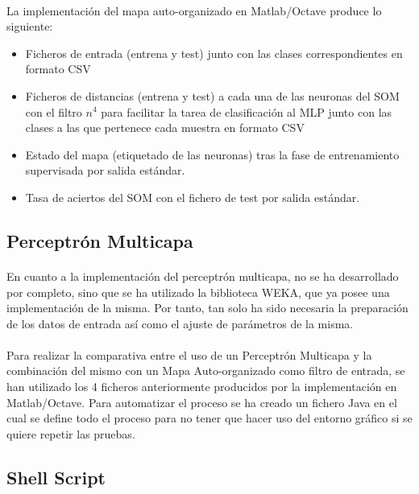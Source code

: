 \documentclass[10pt, a4paper,spanish]{article}
\begin{document}
			\paragraph{}
			La implementación del mapa auto-organizado en Matlab/Octave produce lo siguiente:

			\begin{itemize}
				\item Ficheros de entrada (entrena y test) junto con las clases correspondientes en formato CSV
				\item Ficheros de distancias (entrena y test) a cada una de las neuronas del SOM con el filtro $n^4$ para facilitar la tarea de clasificación al MLP  junto con las clases a las que pertenece cada muestra en formato CSV
				\item Estado del mapa (etiquetado de las neuronas) tras la fase de entrenamiento supervisada por salida estándar.
				\item Tasa de aciertos del SOM con el fichero de test por salida estándar.
			\end{itemize}

		\subsection{Perceptrón Multicapa}

			\paragraph{}
			En cuanto a la implementación del perceptrón multicapa, no se ha desarrollado por completo, sino que se ha utilizado la biblioteca WEKA, que ya posee una implementación de la misma. Por tanto, tan solo ha sido necesaria la preparación de los datos de entrada así como el ajuste de parámetros de la misma.

			\paragraph{}
			Para realizar la comparativa entre el uso de un Perceptrón Multicapa y la combinación del mismo con un Mapa Auto-organizado como filtro de entrada, se han utilizado los 4 ficheros anteriormente producidos por la implementación en Matlab/Octave. Para automatizar el proceso se ha creado un fichero Java en el cual se define todo el proceso para no tener que hacer uso del entorno gráfico si se quiere repetir las pruebas.

		\subsection{Shell Script}
\end{document}

